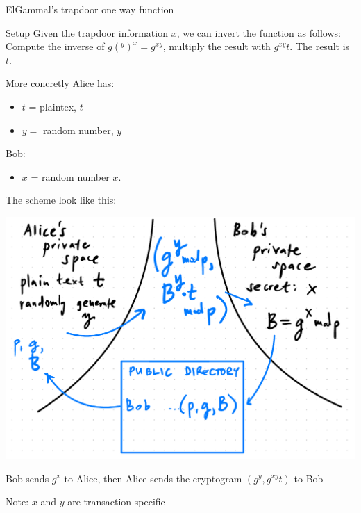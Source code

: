 \begin{parag}{ElGammal's trapdoor one way function}
\begin{subparag}{Setup}
        Given the trapdoor information $x$, we can invert the function as follows:
        Compute the inverse of $g(^y)^x = g^{xy}$, multiply the result with $g^{xy}t$. The result is $t$.
    \end{subparag}
\begin{subparag}{More concretly}
    Alice has:
    \begin{itemize}
        \item $t$ = plaintex, $t$
        \item $y = $ random number, $y$
    \end{itemize}
    Bob:
    \begin{itemize}
        \item $x$ = random number $x$.
    \end{itemize}
    The scheme look like this:
    \begin{center}
        \includegraphics[scale=0.5]{42025-03-19.png}
    \end{center}
    Bob sends $g^x$ to Alice, then Alice sends the cryptogram $(g^y, g^{xy}t)$ to Bob
    \begin{framedremark}
        Note: $x$ and $y$ are transaction specific
    \end{framedremark}
    
    
    
\end{subparag}
\end{parag}

